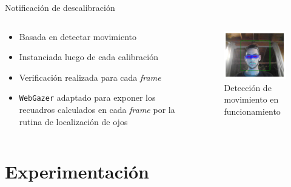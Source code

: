 \documentclass[aspectratio=169]{beamer}
\begin{document}
\begin{frame}{Notificación de descalibración}

  \begin{columns}
    \begin{column}{.5\textwidth}
      \begin{itemize}
        \item Basada en detectar movimiento
        \item Instanciada luego de cada calibración
        \item Verificación realizada para cada \textit{frame}
        \item[\emoji{party-popper}] \texttt{WebGazer} adaptado para exponer los
          recuadros calculados en cada \textit{frame} por la rutina de
          localización de ojos
      \end{itemize}
    \end{column}

    \begin{column}{.5\textwidth}
      \begin{figure}
        \centering
        \includegraphics[width=\textwidth]{img/eyetracker-playground-screenshot.png}
        \caption{Detección de movimiento en funcionamiento}
      \end{figure}
    \end{column}
  \end{columns}

\end{frame}

\section{Experimentación}
\end{document}
